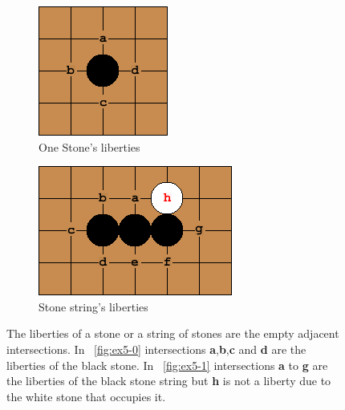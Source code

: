 \documentclass{l4proj}
\newcommand{\bo}[1]{\textbf{#1}}
\begin{document}
\begin{figure}[!ht]
\centering
\begin{subfigure}[b]{0.20\textwidth}
\includegraphics[width=\textwidth]{ex/Ex5-0.png}
\caption{One Stone's liberties}
\label{fig:ex5-0}
\end{subfigure}\qquad
\begin{subfigure}[b]{0.3\textwidth}
\includegraphics[width=\textwidth]{ex/Ex5-1.png}
\caption{Stone string's liberties}
\label{fig:ex5-1}
\end{subfigure}
\caption{The liberties of a stone or a string of stones are the empty adjacent intersections.  In ~\autoref{fig:ex5-0} intersections \bo{a},\bo{b},\bo{c} and \bo{d} are the liberties of the black stone.
In ~\autoref{fig:ex5-1} intersections \bo{a} to \bo{g} are the liberties of the black stone string but \bo{h} is not a liberty due to the white stone that occupies it.}
\label{fig:ex5}
\end{figure}
\end{document}
